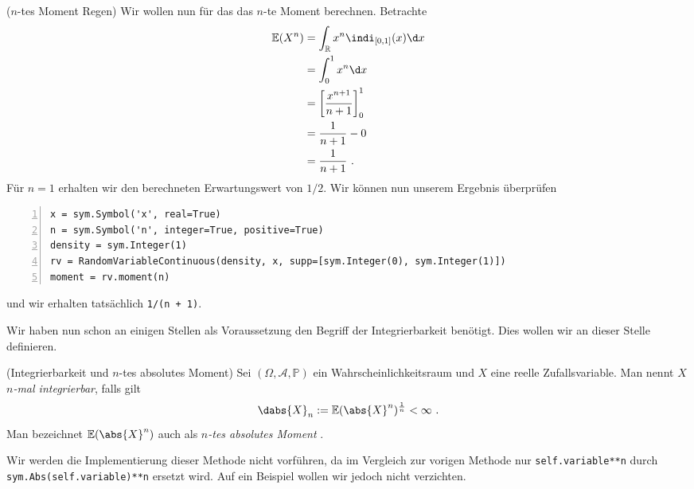 \begin{Beispiel}{($n$-tes Moment Regen)}
Wir wollen nun für das \hyperlink{Bsp:Regen}{} das $n$-te Moment berechnen. Betrachte
\begin{align*}
\mathbb{E}(X^n) &= \int_\mathbb{R} x^n \indi_{[0, 1]}(x) \d x\\
&= \int_0^1 x^n \d x\\
&= \left[ \frac{x^{n+1}}{n + 1} \right]_0^1\\
&= \frac{1}{n + 1} - 0\\
&= \frac{1}{n + 1}~.
\end{align*}
Für $n = 1$ erhalten wir den \hyperlink{Bsp:ErwRegen}{} berechneten Erwartungswert von $1/2$. Wir können nun unserem Ergebnis überprüfen
\begin{lstlisting}[numbers=left, numberstyle=\tiny\color{codegray}]
x = sym.Symbol('x', real=True)
n = sym.Symbol('n', integer=True, positive=True)
density = sym.Integer(1)
rv = RandomVariableContinuous(density, x, supp=[sym.Integer(0), sym.Integer(1)])
moment = rv.moment(n)
\end{lstlisting}
und wir erhalten tatsächlich \lstinline|1/(n + 1)|.
\end{Beispiel}

\newpage

Wir haben nun schon an einigen Stellen als Voraussetzung den Begriff der Integrierbarkeit benötigt. Dies wollen wir an dieser Stelle definieren.

\begin{Definition}{(Integrierbarkeit und $n$-tes absolutes Moment)}
Sei $(\Omega, \mathscr{A}, \mathbb{P})$ ein Wahrscheinlichkeitsraum und $X$ eine reelle Zufallsvariable. Man nennt $X$ \textit{$n$-mal integrierbar}, falls gilt
\[\dabs{X}_n := \mathbb{E}(\abs{X}^n)^\frac{1}{n} < \infty~.\]
Man bezeichnet $\mathbb{E}(\abs{X}^n)$ auch als \textit{$n$-tes absolutes Moment} .
\end{Definition}

Wir werden die Implementierung dieser Methode nicht vorführen, da im Vergleich zur vorigen Methode nur \lstinline|self.variable**n| durch \lstinline|sym.Abs(self.variable)**n| ersetzt wird. Auf ein Beispiel wollen wir jedoch nicht verzichten.

